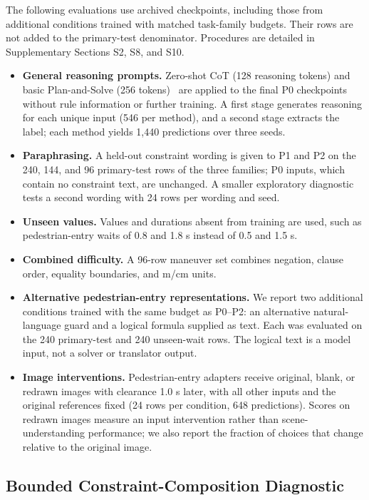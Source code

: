 The following evaluations use archived checkpoints, including those from
additional conditions trained with matched task-family budgets. Their rows are
not added to the primary-test denominator. Procedures are detailed in
Supplementary Sections S2, S8, and S10.
\begin{itemize}
\item \textbf{General reasoning prompts.} Zero-shot CoT (128 reasoning tokens)
and basic Plan-and-Solve (256 tokens)~\cite{r16,r17} are applied to the final
P0 checkpoints without rule information or further training. A first stage
generates reasoning for each unique input (546 per method), and a second stage
extracts the label; each method yields 1,440 predictions over three seeds.
\item \textbf{Paraphrasing.} A held-out constraint wording is given to P1 and
P2 on the 240, 144, and 96 primary-test rows of the three families; P0
inputs, which contain no constraint text, are unchanged. A smaller exploratory
diagnostic tests a second wording with 24 rows per wording and seed.
\item \textbf{Unseen values.} Values and durations absent from training are
used, such as pedestrian-entry waits of 0.8 and 1.8 s instead of 0.5 and 1.5 s.
\item \textbf{Combined difficulty.} A 96-row maneuver set combines negation,
clause order, equality boundaries, and m/cm units.
\item \textbf{Alternative pedestrian-entry representations.} We report two
additional conditions trained with the same budget as P0--P2: an alternative
natural-language guard and a logical formula supplied as text. Each was evaluated on the 240 primary-test
and 240 unseen-wait rows. The logical text is a model input, not a solver or
translator output.
\item \textbf{Image interventions.} Pedestrian-entry adapters receive original,
blank, or redrawn images with clearance 1.0 s later, with all other inputs and
the original references fixed (24 rows per condition, 648 predictions). Scores
on redrawn images measure an input intervention rather than scene-understanding performance;
we also report the fraction of choices that change relative to the original
image.
\end{itemize}

\subsection{Bounded Constraint-Composition Diagnostic}\label{sec:setup-composition}

